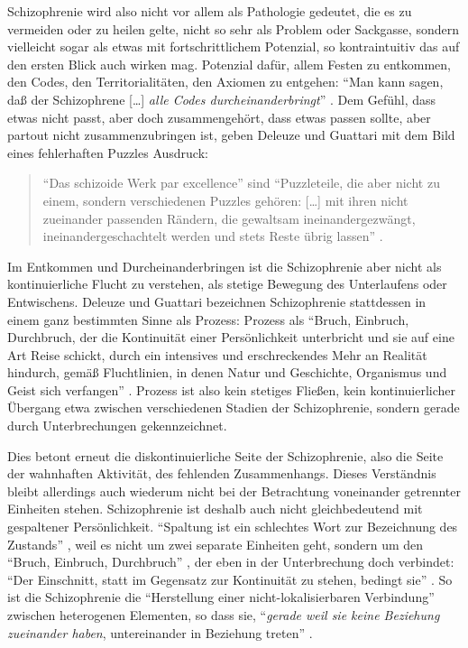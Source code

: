 \documentclass[12pt,
               paper=a4,
               twoside=false,
               onehalfspacing,
               bibliography=totoc,
               toc=graduated,
               ]{scrartcl}
\newcommand{\lips}{\dots\unkern}
\newcommand{\pc}[2]{\parencite[#1]{#2}}
\newcommand{\dg}{Deleuze und Guattari\xspace}
\begin{document}
Schizophrenie wird also nicht vor allem als Pathologie gedeutet, die
es zu vermeiden oder zu heilen gelte, nicht so sehr als Problem oder
Sackgasse, sondern vielleicht sogar als etwas mit fortschrittlichem
Potenzial, so kontraintuitiv das auf den ersten Blick auch wirken mag.
Potenzial dafür, allem Festen zu entkommen, den Codes, den
Territorialitäten, den Axiomen zu entgehen: "`Man kann sagen, daß der
Schizophrene [\lips] \emph{alle Codes durcheinanderbringt}"' \pc{S.
22, Hervorh. im Orig.}{ao}. Dem Gefühl, dass etwas nicht passt, aber
doch zusammengehört, dass etwas passen sollte, aber partout nicht
zusammenzubringen ist, geben \dg mit dem Bild eines fehlerhaften
Puzzles Ausdruck:
%
\begin{spacing}{1}
\begin{quote}
"`Das schizoide Werk par excellence"' \pc{54}{ao} sind "`Puzzleteile,
die aber nicht zu einem, sondern verschiedenen Puzzles gehören:
[\lips] mit ihren nicht zueinander passenden Rändern, die gewaltsam
ineinandergezwängt, ineinandergeschachtelt werden und stets Reste
übrig lassen"' \pc{54}{ao}.
\end{quote}
\end{spacing}

Im Entkommen und Durcheinanderbringen ist die Schizophrenie aber nicht
als kontinuierliche Flucht zu verstehen, als stetige Bewegung des
Unterlaufens oder Entwischens. \dg bezeichnen Schizophrenie
stattdessen in einem ganz bestimmten Sinne als Prozess: Prozess als
"`Bruch, Einbruch, Durchbruch, der die Kontinuität einer
Persönlichkeit unterbricht und sie auf eine Art Reise schickt, durch
ein intensives und erschreckendes \glq Mehr an Realität\grq{}
hindurch, gemäß Fluchtlinien, in denen Natur und Geschichte,
Organismus und Geist sich verfangen"' \pc{28}{schizg}. Prozess ist
also kein stetiges Fließen, kein kontinuierlicher Übergang etwa
zwischen verschiedenen Stadien der Schizophrenie, sondern gerade durch
Unterbrechungen gekennzeichnet.

Dies betont erneut die diskontinuierliche Seite der Schizophrenie,
also die Seite der wahnhaften Aktivität, des fehlenden Zusammenhangs.
Dieses Verständnis bleibt allerdings auch wiederum nicht bei der
Betrachtung voneinander getrennter Einheiten stehen. Schizophrenie ist
deshalb auch nicht gleichbedeutend mit gespaltener Persönlichkeit.
"`Spaltung ist ein schlechtes Wort zur Bezeichnung des Zustands"'
\pc{27}{schizg}, weil es nicht um zwei separate Einheiten geht,
sondern um den "`Bruch, Einbruch, Durchbruch"' \pc{28}{schizg}, der
eben in der Unterbrechung doch verbindet: "`Der Einschnitt, statt im
Gegensatz zur Kontinuität zu stehen, bedingt sie"' \pc{47}{ao}. So ist
die Schizophrenie die "`Herstellung einer nicht-lokalisierbaren
Verbindung"' \pc{19}{schizg} zwischen heterogenen Elementen, so dass
sie, "`\emph{gerade weil sie keine Beziehung zueinander haben},
untereinander in Beziehung treten"' \pc{S. 19, Hervorh. im
Orig.}{schizg}.
\end{document}
